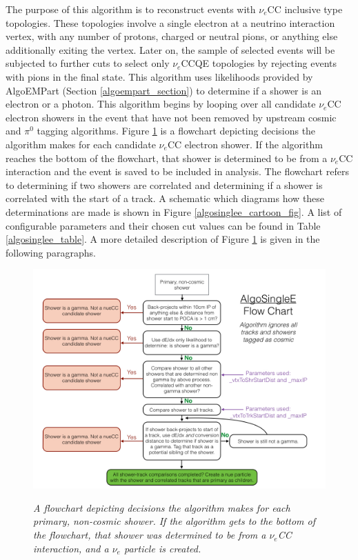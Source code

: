 The purpose of this algorithm is to reconstruct events with $\nu_e$CC inclusive type topologies. These topologies involve a single electron at a neutrino interaction vertex, with any number of protons, charged or neutral pions, or anything else additionally exiting the vertex. Later on, the sample of selected events will be subjected to further cuts to select only $\nu_e$CCQE topologies by rejecting events with pions in the final state. This algorithm uses likelihoods provided by AlgoEMPart (Section \ref{algoempart_section}) to determine if a shower is an electron or a photon. This algorithm begins by looping over all candidate $\nu_e$CC electron showers in the event that have not been removed by upstream cosmic and $\pi^0$ tagging algorithms. Figure \ref{algosinglee_flowchart_fig} is a flowchart depicting decisions the algorithm makes for each candidate $\nu_e$CC electron shower. If the algorithm reaches the bottom of the flowchart, that shower is determined to be from a $\nu_e$CC interaction and the event is saved to be included in analysis. The flowchart refers to determining if two showers are correlated and determining if a shower is correlated with the start of a track. A schematic which diagrams how these determinations are made is shown in Figure \ref{algosinglee_cartoon_fig}. A list of configurable parameters and their chosen cut values can be found in Table \ref{algosinglee_table}. A more detailed description of Figure \ref{algosinglee_flowchart_fig} is given in the following paragraphs.\\


\begin{figure}[ht!]
\centering
\includegraphics[width=150mm]{Figures/algosinglee_flowchart.png}\\
\caption{\textit{A flowchart depicting decisions the algorithm makes for each primary, non-cosmic shower. If the algorithm gets to the bottom of the flowchart, that shower was determined to be from a $\nu_e$CC interaction, and a $\nu_e$ particle is created.}}
\label{algosinglee_flowchart_fig}
\end{figure}

